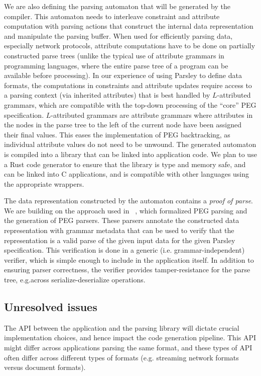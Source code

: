 \documentclass[letterpaper]{article}
\begin{document}
We are also defining the parsing automaton that will be generated by
the compiler.  This automaton needs to interleave constraint and
attribute computation with parsing actions that construct the internal
data representation and manipulate the parsing buffer.  When used for
efficiently parsing data, especially network protocols, attribute
computations have to be done on partially constructed parse trees
(unlike the typical use of attribute grammars in programming
languages, where the entire parse tree of a program can be available
before processing).  In our experience of using Parsley to define data
formats, the computations in constraints and attribute updates require
access to a parsing context (via inherited attributes) that is best
handled by $L$-attributed grammars, which are compatible with the
top-down processing of the ``core'' PEG specification.  $L$-attributed
grammars are attribute grammars where attributes in the nodes in the
parse tree to the left of the current node have been assigned their
final values.  This eases the implementation of PEG backtracking, as
individual attribute values do not need to be unwound.  The generated
automaton is compiled into a library that can be linked into
application code.  We plan to use a Rust code generator to ensure that
the library is type and memory safe, and can be linked into C
applications, and is compatible with other languages using the
appropriate wrappers.

The data representation constructed by the automaton contains a {\em
  proof of parse}.  We are building on the approach used in
~\cite{Blaudeau_2020}, which formalized PEG parsing and the generation
of PEG parsers.  These parsers annotate the constructed data
representation with grammar metadata that can be used to verify that
the representation is a valid parse of the given input data for the
given Parsley specification.  This verification is done in a generic
(i.e. grammar-independent) verifier, which is simple enough to include
in the application itself.  In addition to ensuring parser
correctness, the verifier provides tamper-resistance for the parse
tree, e.g.\@ across serialize-deserialize operations.

\subsection*{Unresolved issues}

The API between the application and the parsing library will dictate
crucial implementation choices, and hence impact the code generation
pipeline.  This API might differ across applications parsing the same
format, and these types of API often differ across different types of
formats (e.g. streaming network formats versus document formats).
\end{document}
